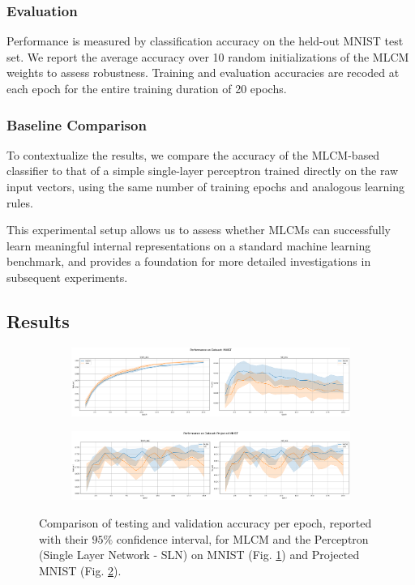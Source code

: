 \documentclass[a4paper,12pt]{report}
\begin{document}
\subsubsection*{Evaluation}
Performance is measured by classification accuracy on the held-out MNIST test set. 
We report the average accuracy over 10 random initializations of the MLCM weights to 
assess robustness. Training and evaluation accuracies are recoded at each epoch 
for the entire training duration of 20 epochs.
%
\subsubsection*{Baseline Comparison}
To contextualize the results, we compare the accuracy of the MLCM-based classifier 
to that of a simple single-layer perceptron trained directly on the raw input vectors, 
using the same number of training epochs and analogous learning rules.
\vspace{0.5em}

This experimental setup allows us to assess whether MLCMs can successfully learn 
meaningful internal representations on a standard machine learning benchmark, and 
provides a foundation for more detailed investigations in subsequent experiments.
\subsection{Results}
\newcommand{\experimentlength}{1}
\begin{figure}[h!]
    \centering
    \begin{subfigure}{\experimentlength\textwidth}
        \includegraphics[width=\linewidth]{pictures/mnist_exp1.png}
        \caption{}\label{fig:mnist_exp1}
    \end{subfigure}
    \hfill
    \begin{subfigure}{\experimentlength\textwidth}
        \includegraphics[width=\linewidth]{pictures/projected_mnist_exp1.png}
        \caption{}\label{fig:emnist_exp1}
    \end{subfigure}
    \caption{Comparison of testing and validation accuracy per epoch, reported with 
    their $95\%$ confidence interval, for MLCM and the Perceptron (Single Layer 
    Network  - SLN) on MNIST (Fig. \ref{fig:mnist_exp1}) and Projected MNIST 
    (Fig. \ref{fig:emnist_exp1}).}
    \label{fig:all_mnist_exp1}
\end{figure}
\end{document}
